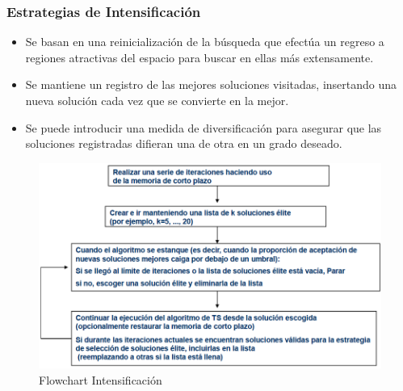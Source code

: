 \documentclass{llncs}
\begin{document}
\subsubsection{Estrategias de Intensificaci\'{o}n}
\begin{itemize}
\item Se basan en una reinicializaci\'{o}n de la b\'{u}squeda que efect\'{u}a un regreso a regiones atractivas del espacio para buscar en ellas m\'{a}s extensamente.
\item Se mantiene un registro de las mejores soluciones visitadas, insertando una nueva soluci\'{o}n cada vez que se convierte en la mejor.
\item Se puede introducir una medida de diversificaci\'{o}n para asegurar que las soluciones registradas difieran una de otra en un grado deseado.
\end{itemize}


\begin{figure}[h]
\centering
\includegraphics[scale=0.7]{img/intensificacion.png}
\caption{Flowchart Intensificaci\'{o}n}
\end{figure}
\end{document}
